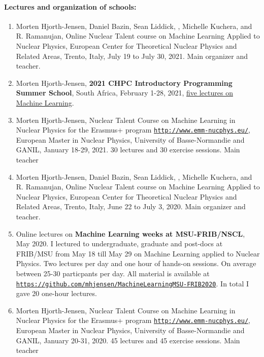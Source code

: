 \documentclass[%
oneside,                 %
final,                   %
10pt]{article}
\begin{document}
\paragraph{Lectures and organization of schools:}
\begin{enumerate}
\item Morten Hjorth-Jensen, Daniel Bazin, Sean Liddick, , Michelle Kuchera, and R. Ramanujan, Online Nuclear Talent course on  Machine Learning Applied to Nuclear Physics, European Center for Theoretical Nuclear Physics and Related Areas, Trento, Italy, July 19 to July 30, 2021. Main organizer and teacher.

\item Morten Hjorth-Jensen, \textbf{2021 CHPC Introductory Programming Summer School}, South Africa, February 1-28, 2021, \href{{https://compphysics.github.io/MLSummerSchool/doc/web/course.html}}{five lectures on Machine Learning}. 

\item Morten Hjorth-Jensen, Nuclear Talent Course on Machine Learning in Nuclear Physics for the Erasmus+ program \href{{http://www.emm-nucphys.eu/}}{\nolinkurl{http://www.emm-nucphys.eu/}}, European Master in Nuclear Physics, University of Basse-Normandie and GANIL, January 18-29, 2021. 30 lectures and 30 exercise sessions. Main teacher

\item Morten Hjorth-Jensen, Daniel Bazin, Sean Liddick, , Michelle Kuchera, and R. Ramanujan, Online Nuclear Talent course on  Machine Learning Applied to Nuclear Physics, European Center for Theoretical Nuclear Physics and Related Areas, Trento, Italy, June 22 to July 3, 2020. Main organizer and teacher.

\item Online lectures on \textbf{Machine Learning weeks at MSU-FRIB/NSCL}, May 2020. I lectured to undergraduate, graduate and post-docs at FRIB/MSU from May 18 till May 29 on Machine Learning applied to Nuclear Physics. Two lectures per day and one hour of hands-on sessions. On average between 25-30 particpants per day. All material is available at \href{{https://github.com/mhjensen/MachineLearningMSU-FRIB2020}}{\nolinkurl{https://github.com/mhjensen/MachineLearningMSU-FRIB2020}}. In total I gave 20 one-hour lectures.

\item Morten Hjorth-Jensen, Nuclear Talent Course on Machine Learning in Nuclear Physics for the Erasmus+ program \href{{http://www.emm-nucphys.eu/}}{\nolinkurl{http://www.emm-nucphys.eu/}}, European Master in Nuclear Physics, University of Basse-Normandie and GANIL, January 20-31, 2020. 45 lectures and 45 exercise sessions. Main teacher


\end{enumerate}
\end{document}
